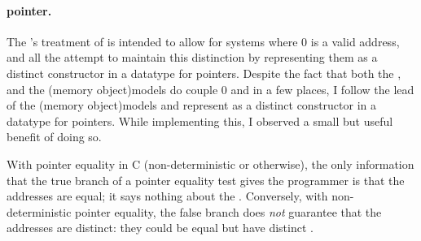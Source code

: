 \paragraph{ pointer.}%
%
%
%
%
The 's treatment of  is intended to allow for
systems where 0 is a valid address, and all the 
attempt to maintain this distinction by representing them as a distinct
constructor in a datatype for pointers. Despite the fact that both the
, and the \kl(memory object){models} do couple 0 and
 in a few places,
I follow the lead of the \kl(memory object){models} and represent
 as a distinct constructor in a datatype for pointers.
While implementing this, I observed a small but useful benefit of doing so.

With pointer equality in C (non-deterministic or otherwise),
the only information that the true branch of a pointer equality test gives the
programmer is that the addresses are equal; it says nothing about the
. Conversely, with non-deterministic pointer equality, the false
branch does \emph{not} guarantee that the addresses are distinct: they could be
equal but have distinct .

